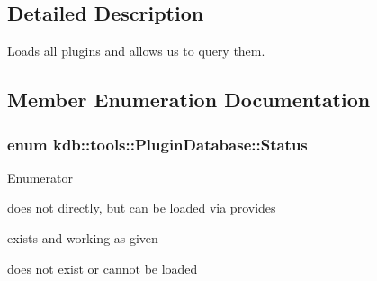 \subsection{Detailed Description}
Loads all plugins and allows us to query them. 

\subsection{Member Enumeration Documentation}
\hypertarget{classkdb_1_1tools_1_1PluginDatabase_afc91ff760616ee83c6afb70e5a2f0601}{
\subsubsection[{Status}]{\setlength{\rightskip}{0pt plus 5cm}enum {\bf kdb\+::tools\+::\+Plugin\+Database\+::\+Status}}}\label{classkdb_1_1tools_1_1PluginDatabase_afc91ff760616ee83c6afb70e5a2f0601}
\begin{Desc}
\item[Enumerator]\par
\begin{description}
\item[{\em 
\hypertarget{classkdb_1_1tools_1_1PluginDatabase_afc91ff760616ee83c6afb70e5a2f0601a73ff10d6a07213c277db4326b3df6c4b}{provides}\label{classkdb_1_1tools_1_1PluginDatabase_afc91ff760616ee83c6afb70e5a2f0601a73ff10d6a07213c277db4326b3df6c4b}
}]does not directly, but can be loaded via provides \item[{\em 
\hypertarget{classkdb_1_1tools_1_1PluginDatabase_afc91ff760616ee83c6afb70e5a2f0601a2b7279a50ed80231a60b0435340c31a8}{real}\label{classkdb_1_1tools_1_1PluginDatabase_afc91ff760616ee83c6afb70e5a2f0601a2b7279a50ed80231a60b0435340c31a8}
}]exists and working as given \item[{\em 
\hypertarget{classkdb_1_1tools_1_1PluginDatabase_afc91ff760616ee83c6afb70e5a2f0601ae789aaff1847ebb77eecb027c5ee0401}{missing}\label{classkdb_1_1tools_1_1PluginDatabase_afc91ff760616ee83c6afb70e5a2f0601ae789aaff1847ebb77eecb027c5ee0401}
}]does not exist or cannot be loaded \end{description}
\end{Desc}


